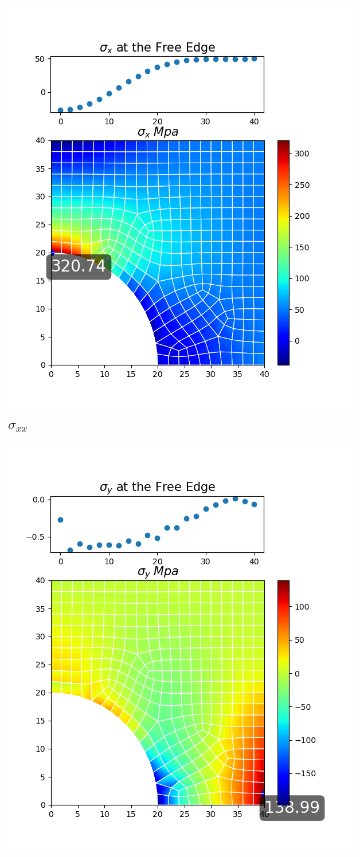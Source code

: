 \documentclass[twoside,twocolumn,10pt]{article}
\begin{document}
\begin{figure}[!ht]
  \begin{subfigure}[c]{0.26\textwidth}
    \includegraphics[width=1.\linewidth]{Q2_5/Q5_1_x_quad.png}
    \caption{$\sigma_{xx}$}
    \label{fig:x_quad}
  \end{subfigure}%
  \begin{subfigure}[c]{0.26\textwidth}
    \includegraphics[width=1.\linewidth]{Q2_5/Q5_1_y_quad.png}

\end{subfigure}
\end{figure}
\end{document}
